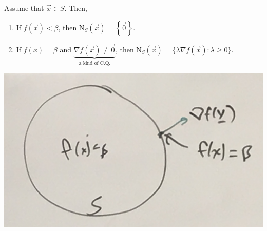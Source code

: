 \documentclass{article}
\begin{document}
Assume that $\vec{x} \in S$. Then,
\begin{enumerate}[label=(\alph*)]
    \item If $f(\vec{x}) < \beta$, then $\text{N}_S(\vec{x}) = \left\{\vec{0}\right\}$.
    \item If $f(x) = \beta$ and $\underbrace{\nabla f(\vec{x}) \neq \vec{0}}_{\text{a kind of C.Q.}}$, then $\text{N}_S(\vec{x}) = \{\lambda\nabla f(\vec{x}) : \lambda \geq 0\}$.
\end{enumerate}

\begin{center}
    \includegraphics[scale=0.12]{IMG_2387.JPG}
\end{center}
\end{document}
